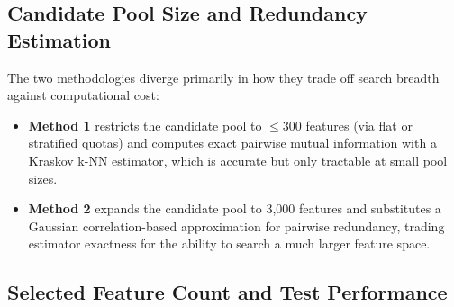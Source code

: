 \subsection{Candidate Pool Size and Redundancy Estimation}
The two methodologies diverge primarily in how they trade off search breadth against computational cost:
\begin{itemize}
\item \textbf{Method 1} restricts the candidate pool to $\leq 300$ features (via flat or stratified quotas) and computes exact pairwise mutual information with a Kraskov k-NN estimator, which is accurate but only tractable at small pool sizes.
\item \textbf{Method 2} expands the candidate pool to 3,000 features and substitutes a Gaussian correlation-based approximation for pairwise redundancy, trading estimator exactness for the ability to search a much larger feature space.
\end{itemize}

\subsection{Selected Feature Count and Test Performance}

\begin{table}[H]
\centering
\caption{Head-to-head comparison of Method 1 (best configuration) and Method 2}
\label{tab:method_comparison}
\renewcommand{\arraystretch}{1.2}
\end{table}

